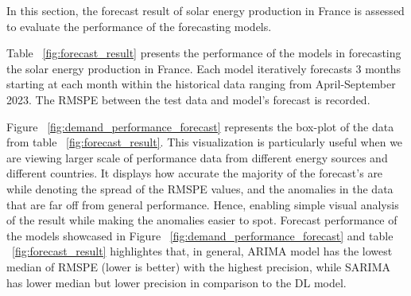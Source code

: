 \documentclass[acmtog]{acmart}
\begin{document}
In this section, the forecast result of solar energy production in France is assessed to evaluate the performance of the forecasting models.

Table ~\ref{fig:forecast_result} presents the performance of the models in forecasting the solar energy production in France. Each model iteratively forecasts 3 months starting at each month within the historical data ranging from April-September 2023. The RMSPE between the test data and model's forecast is recorded.

\begin{table}[hbt!]
    \centering
    \caption{RMSPE of solar energy quarterly forecast in France}
    \label{fig:forecast_result}
\end{table}




Figure ~\ref{fig:demand_performance_forecast} represents the box-plot of the data from table ~\ref{fig:forecast_result}. This visualization is particularly useful when we are viewing larger scale of performance data from different energy sources and different countries. It displays how accurate the majority of the forecast's are while denoting the spread of the RMSPE values, and the anomalies in the data that are far off from general performance. Hence, enabling simple visual analysis of the result while making the anomalies easier to spot. Forecast performance of the models showcased in Figure ~\ref{fig:demand_performance_forecast} and table ~\ref{fig:forecast_result} highlightes that, in general, ARIMA model has the lowest median of RMSPE (lower is better) with the highest precision, while SARIMA has lower median but lower precision in comparison to the DL model. \\
\end{document}
